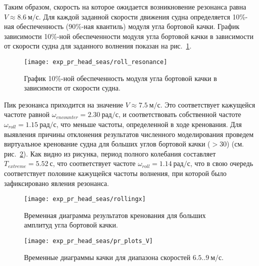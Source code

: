Таким образом, скорость на которое ожидается возникновение резонанса равна $V \approx 8.6\ \text{м/с}$.
Для каждой заданной скорости движения судна определяется 10\%-ная обеспеченность (90\%-ная квантиль) модуля угла бортовой качки. График зависимости 10\%-ной обеспеченности модуля угла бортовой качки в зависимости от скорости судна для заданного волнения  показан на рис.~\ref{pr2_res}.

\begin{figure}[h!]
	\begin{center}
	\texttt{[image: exp\_pr\_head\_seas/roll\_resonance]}
	\end{center}
	\caption{График 10\%-ной обеспеченность модуля угла бортовой качки в зависимости от скорости судна.}
	\label{pr2_res}
\end{figure}

Пик резонанса приходится на значение $V \approx 7.5\ \text{м/с}$.
Это соответствует кажущейся частоте равной $\omega_{encounter} = 2.30\ \text{рад/с}$, и соответствовать собственной частоте $\omega_{roll} = 1.15\ \text{рад/с}$, 
что меньше частоты, определенной в ходе кренования. 
Для выявления причины отклонения результатов численного моделирования проведем виртуальное кренование судна для больших углов бортовой качки ($>30$) (см. рис.~\ref{rollingx}). Как видно из рисунка, период полного колебания составляет $T_{extreme} = 5.52\ \text{с}$, что соответствует частоте $\omega_{roll} = 1.14\ \text{рад/с}$, что в свою очередь соответствует половине кажущейся частоты волнения, при которой было зафиксировано явления резонанса.

\begin{figure}[h!]
	\begin{center}
	\texttt{[image: exp\_pr\_head\_seas/rollingx]}
	\end{center}
	\caption{Временная диаграмма результатов кренования для больших амплитуд угла бортовой качки.}
	\label{rollingx}
\end{figure}


\begin{sidewaysfigure}
	\begin{center}
	\texttt{[image: exp\_pr\_head\_seas/pr\_plots\_V]}
	\end{center}
	\caption{Временные диаграммы качки для диапазона скоростей $6.5..9\ \text{м/с}$.}
	\label{exp_pr_rolling_resonance_lag}
\end{sidewaysfigure}


